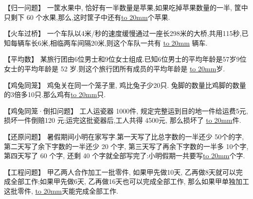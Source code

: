 
\item {
    【归一问题】
    一筐水果中, 恰好有一半数量是苹果,如果吃掉苹果数量的一半, 筐中只剩下 60 个水果,那么,这时筐子中还有\underline{\hbox to 20mm{}}个苹果.
    \vspace{2cm} 
}

\item {
    【火车过桥】
    一个车队以4米/秒的速度缓慢通过一座长298米的大桥,共用115秒,已知每辆车长6米,相临两车间隔20米,则这个车队一共有 \underline{\hbox to 20mm{}} 辆车.
    \vspace{2cm}
}

\item {
    【平均数】
    某旅行团由6位男士和9位女士组成.已知6位男士的平均年龄是57岁9位女士的平均年龄是 52 岁.则这个旅行团所有成员的平均年龄是 \underline{\hbox to 20mm{}}岁.
    \vspace{2cm}
}

\item {
    【鸡兔同笼】
    鸡兔关在同一个笼子里, 鸡比兔子少20只. 兔脚的数量比鸡脚的数量的3倍多10只.那么鸡有\underline{\hbox to 20mm{}}只. 
    \vspace{2cm}
}

\item {
    【鸡兔同笼·倒扣问题】
    工人运瓷器 1000件, 规定完整运到目的地一件给运费5元, 损坏一件倒赔120 元;运完这批瓷器后,工人共得 4500元, 那么损坏了 \underline{\hbox to 20mm{}}件.
    \vspace{2cm}
}

\item {
    【还原问题】
    暑假期间小明在家写字.第一天写了比总字数的一半还少 50个的字, 第二天写了余下字数的一半还少 20 个字, 第三天写了再余下字数的一半多 10个字, 第四天写了 60 个字, 还剩 40 个字就全部写完了:小明假期一共要写\underline{\hbox to 20mm{}}个字.
    \vspace{2cm}
}

\item {
    【工程问题】
    甲乙两人合作加工一批零件, 如果甲先做10天, 乙再做8天就可以完成全部工作;如果甲先做6天, 乙再做16天也可以完成全部工作, 那么如果甲单独加工这批零件, \underline{\hbox to 20mm{}}天能完成全部工作.
    \vspace{2cm}
}

